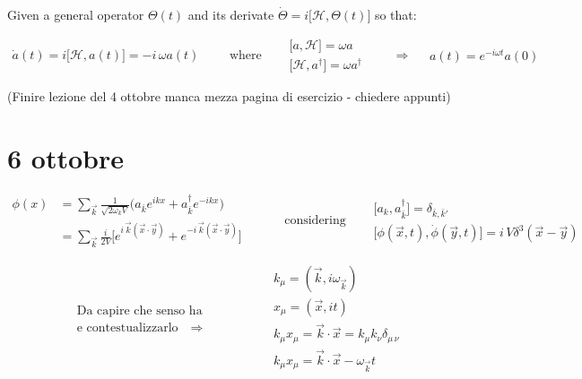 \documentclass[class=article]{standalone}
\begin{document}
Given a general operator $\Theta (t)$ and its derivate $\dot \Theta = i \Big[ \mathcal{H}, \Theta(t) \Big]$ so that: 

\begin{equation*}
\begin{split}
\dot a(t) = i  \Big[ \mathcal{H}, a(t) \Big] = - i \, \omega a(t)
\end{split} 
\quad\quad \mbox{where}\quad
\begin{split}
& \Big[ a ,  \mathcal{H}\Big]  = \omega a \\
& \Big[ \mathcal{H} , a^{\dagger} \Big]  = \omega a^{\dagger}
\end{split}
\quad\quad\Rightarrow\quad
\begin{split}
a(t) = e^{-i \omega t} a(0)
\end{split}
\end{equation*}

(Finire lezione del 4 ottobre manca mezza pagina di esercizio - chiedere appunti)


\newpage
\section{6 ottobre}

\begin{equation*}
\begin{split}
\phi(x) & = \sum_{\vec k} \frac{1}{\sqrt{2 \omega_k V}} \Big( a_{\bar k} e^{i k x} +  a_{\bar k}^{\dagger} e^{-i k x} \Big) \\
& = \sum_{\vec k} \frac{i}{2 V} \Big[ e^{i\,\vec k (\vec x \cdot \vec y)} + e^{- i\,\vec k (\vec x \cdot \vec y)} \Big]
\end{split} \quad\quad\quad\mbox{considering} \quad
\begin{split}
& \Big[ a_k , a_{\bar k}^{\dagger}  \Big] = \delta_{\bar k, \bar k'} \\
& \Big[ \phi(\vec x, t), \dot\phi(\vec y, t) \Big] = i \, V \delta^3 (\vec x - \vec y)
\end{split}
\end{equation*}

\begin{equation*}
\begin{split}
&\mbox{Da capire che senso ha} \\
&\mbox{e contestualizzarlo} \quad\Rightarrow
\end{split}\quad\quad\quad\quad
\begin{split}
& k_{\mu} = (\vec k , i \omega_{\vec k}) \\
& x_{\mu} = (\vec x , i t) \\
& k_{\mu} x_{\mu} = \vec k \cdot \vec x = k_{\mu} k_{\nu} \delta_{\mu\,\nu} \\
& k_{\mu} x_{\mu} = \vec k \cdot \vec x - \omega_{\vec k} t
\end{split}
\end{equation*}
\end{document}
